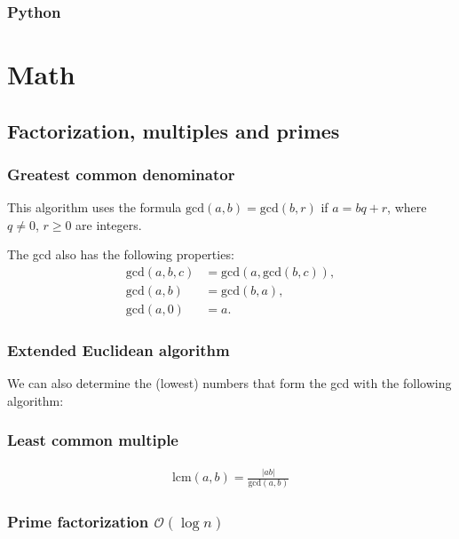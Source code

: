 
\subsubsection{Python}





\section{Math}

\subsection{Factorization, multiples and primes}

\subsubsection{Greatest common denominator}
This algorithm uses the formula $\text{gcd}(a,b) = \text{gcd}(b,r)$ if $a = bq + r$, where $q \neq 0$, $r \geq 0$ are integers.

The gcd also has the following properties:
\begin{align*}
    \text{gcd}(a, b, c) &= \text{gcd}(a, \text{gcd}(b, c)), \\
    \text{gcd}(a, b) &= \text{gcd}(b, a), \\
    \text{gcd}(a, 0) &= a.
\end{align*}

\subsubsection{Extended Euclidean algorithm}
We can also determine the (lowest) numbers that form the gcd with the following algorithm:

\subsubsection{Least common multiple}
\begin{align*}
    \text{lcm}(a, b) = \frac{|ab|}{\text{gcd}(a, b)}
\end{align*}

\subsubsection{Prime factorization $\mathcal O(\log n)$}

